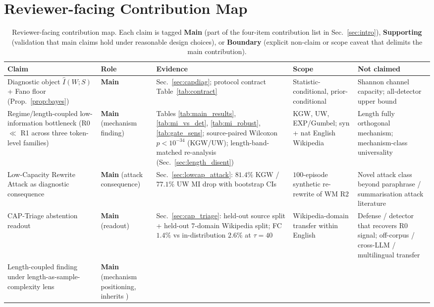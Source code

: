 \documentclass[11pt]{article}
\begin{document}
\section{Reviewer-facing Contribution Map}
\label{sec:claim_support}\label{app:claim_support}
\begin{table}[h]
\centering\small
\caption{Reviewer-facing contribution map. Each claim is tagged
\textbf{Main} (part of the four-item contribution list in
Sec.~\ref{sec:intro}), \textbf{Supporting} (validation that main claims
hold under reasonable design choices), or \textbf{Boundary} (explicit
non-claim or scope caveat that delimits the main contribution).}
\label{tab:claim_support}
\begin{tabular}{p{} p{} p{} p{} p{}}
\toprule
Claim & Role & Evidence & Scope & Not claimed \\
\midrule
Diagnostic object $\hat I(W;S)$ + Fano floor (Prop.~\ref{prop:bayes})
& \textbf{Main}
& Sec.~\ref{sec:capdiag}; protocol contract Table~\ref{tab:contract}
& Statistic-conditional, prior-conditional
& Shannon channel capacity; all-detector upper bound \\
\midrule
Regime/length-coupled low-information bottleneck (R0 $\ll$ R1 across three
token-level families)
& \textbf{Main} (mechanism finding)
& Tables \ref{tab:main_results}, \ref{tab:mi_vs_det}, \ref{tab:mi_robust},
\ref{tab:gate_sens}; source-paired Wilcoxon $p<10^{-34}$ (KGW/UW);
length-band-matched re-analysis (Sec.~\ref{sec:length_disent})
& KGW, UW, EXP/Gumbel; syn + nat English Wikipedia
& Length fully orthogonal mechanism; mechanism-class universality \\
\midrule
Low-Capacity Rewrite Attack as diagnostic consequence
& \textbf{Main} (attack consequence)
& Sec.~\ref{sec:lowcap_attack}: $81.4\%$ KGW / $77.1\%$ UW MI drop with
bootstrap CIs
& $100$-episode synthetic re-rewrite of WM R2
& Novel attack class beyond paraphrase / summarisation attack literature \\
\midrule
CAP-Triage abstention readout
& \textbf{Main} (readout)
& Sec.~\ref{sec:cap_triage}: held-out source split + held-out $7$-domain
Wikipedia split; FC $1.4\%$ vs in-distribution $2.6\%$ at $\tau{=}40$
& Wikipedia-domain transfer within English
& Defense / detector that recovers R0 signal; off-corpus / cross-LLM /
multilingual transfer \\
\midrule
Length-coupled finding under length-as-sample-complexity lens
& \textbf{Main} (mechanism positioning, inherits \citet{kirchenbauer2024reliability})

\end{tabular}
\end{table}
\end{document}
